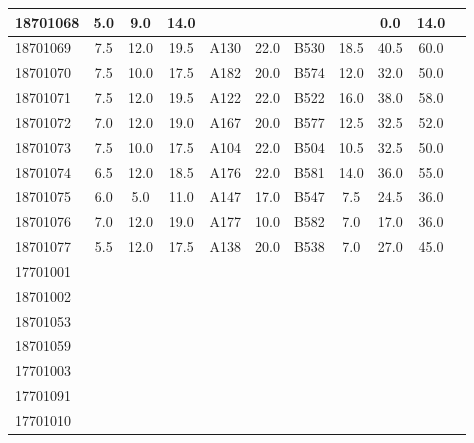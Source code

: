 \documentclass[12pt]{article}
\begin{document}
\begin{center}
\begin{small}
\begin{tabular}{|l|c|c|c|c|c|c|c|c|c|c|}
18701068 & 5.0 & 9.0 & 14.0 &  &  &  &  & 0.0 & 14.0\\ \hline 
18701069 & 7.5 & 12.0 & 19.5 & A130 & 22.0 & B530 & 18.5 & 40.5 & 60.0\\ \hline 
18701070 & 7.5 & 10.0 & 17.5 & A182 & 20.0 & B574 & 12.0 & 32.0 & 50.0\\ \hline 
18701071 & 7.5 & 12.0 & 19.5 & A122 & 22.0 & B522 & 16.0 & 38.0 & 58.0\\ \hline 
18701072 & 7.0 & 12.0 & 19.0 & A167 & 20.0 & B577 & 12.5 & 32.5 & 52.0\\ \hline 
18701073 & 7.5 & 10.0 & 17.5 & A104 & 22.0 & B504 & 10.5 & 32.5 & 50.0\\ \hline 
18701074 & 6.5 & 12.0 & 18.5 & A176 & 22.0 & B581 & 14.0 & 36.0 & 55.0\\ \hline 
18701075 & 6.0 & 5.0 & 11.0 & A147 & 17.0 & B547 & 7.5 & 24.5 & 36.0\\ \hline 
18701076 & 7.0 & 12.0 & 19.0 & A177 & 10.0 & B582 & 7.0 & 17.0 & 36.0\\ \hline 
18701077 & 5.5 & 12.0 & 17.5 & A138 & 20.0 & B538 & 7.0 & 27.0 & 45.0\\ \hline 
17701001 &  &  &  &  &  &  &  &  & \\ \hline 
18701002 &  &  &  &  &  &  &  &  & \\ \hline 
18701053 &  &  &  &  &  &  &  &  & \\ \hline 
18701059 &  &  &  &  &  &  &  &  & \\ \hline 
17701003 &  &  &  &  &  &  &  &  & \\ \hline 
17701091 &  &  &  &  &  &  &  &  & \\ \hline 
17701010 &  &  &  &  &  &  &  &  & \\ \hline 
        \end{tabular}
            \end{small}
            \end{center}
  \centering
            
\end{document}
